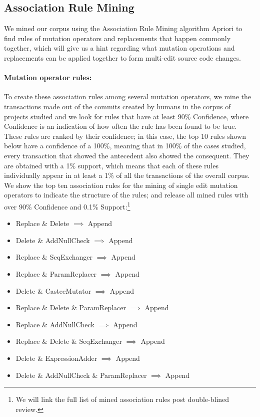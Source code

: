 \documentclass[conference]{IEEEtran}
\begin{document}
\subsection{Association Rule Mining} \label{armRes}

We mined our corpus using the Association Rule Mining algorithm Apriori 
to find rules of mutation operators and 
replacements that happen commonly together, which will give us a hint regarding
what mutation operations and replacements can be applied together to form multi-edit
source code changes.

\paragraph{Mutation operator rules:}
To create these association rules among several mutation operators, we mine the
transactions made out of the commits created by humans in the corpus of projects
studied and we look for rules that have at least 90\% Confidence, where
Confidence is an indication of how often the rule has been found to be true.  
These rules are ranked by their confidence; in this case, the top 10 rules shown
below have a confidence of a 100\%, meaning that in 100\% of the cases
studied, every transaction that showed the antecedent also showed the consequent.
They are obtained with a 1\% support, which means that each of these rules
individually appear in at least a 1\% of all the transactions of the overall
corpus. We show the top ten association rules for the mining of single edit 
mutation operators to indicate the structure of the rules; and release all mined
rules with over 90\% Confidence and 0.1\% Support:\footnote{We 
  will link the full list of mined association rules post double-blined
  review.} 


\begin{itemize}
\item Replace \& Delete $\implies$ Append
\item Delete \& AddNullCheck $\implies$ Append
\item Replace \& SeqExchanger $\implies$ Append
\item Replace \& ParamReplacer $\implies$ Append
\item Delete \& CasteeMutator $\implies$ Append
\item Replace \& Delete \& ParamReplacer $\implies$ Append
\item Replace \& AddNullCheck $\implies$ Append
\item Replace \& Delete \& SeqExchanger $\implies$ Append
\item Delete \& ExpressionAdder $\implies$ Append
\item Delete \& AddNullCheck \& ParamReplacer $\implies$ Append
\end{itemize}
\end{document}
